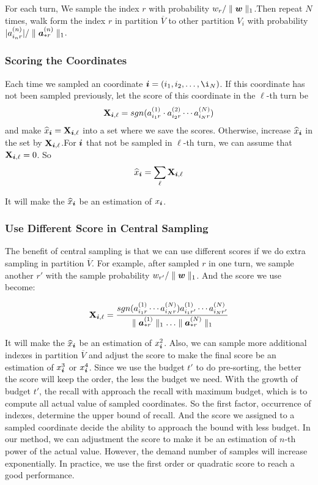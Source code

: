 \documentclass{article}
\newcommand{\Sca}[3]{{#1}^{(#2)}_{i_#2#3}}%
\newcommand{\V}[1]{{\bm{{\MakeLowercase{#1}}}}}
\newcommand{\Vacol}[1]{\V{a}^{(#1)}_{*r}}
\newcommand{\M}[1]{{\bm{\mathbf{\MakeUppercase{#1}}}}}
\newcommand{\norm}[2]{\parallel#1\parallel_{#2}}
\begin{document}
For each turn, We sample the index $r$ with probability $w_r/\norm{\V{w}}{1}$.Then repeat $N$ times, walk form the index $r$ in partition $\overline{V}$ to other partition $V_i$ with probability $|\Sca{a}{n}{r}|/\norm{\Vacol{n}}{1}$.

\subsubsection{Scoring the Coordinates}

Each time we sampled an coordinate $\V{i} = (i_1,i_2,\ldots,\i_N) $. If this coordinate has not been sampled previously, let the score of this coordinate in the $\ell $-th turn be
\[
\M{X}_{\V{i},\ell}  = sgn(\Sca{a}{1}{r}\cdot\Sca{a}{2}{r}\cdots\Sca{a}{N}{r})
\]
and make $\widehat{x}_{\V{i}} = \M{X}_{\V{i},\ell}$ into a set where we save the scores. Otherwise, increase $\widehat{x}_{\V{i}}$ in the set by $\M{X}_{\V{i},\ell}$.For $\V{i}$ that not be sampled in $\ell$-th turn, we can assume that $\M{X}_{\V{i},\ell}=0$. So
\[
\widehat{x}_{\V{i}} = \sum_{\ell} \M{X}_{\V{i},\ell}
\]

It will make the $\widehat{x}_{\V{i}}$ be an estimation of $x_{\V{i}}$.

\subsubsection{Use Different Score in Central Sampling}
The benefit of central sampling is that we can use different scores if we do extra sampling in partition $\overline{V}$. For example, after sampled $r$ in one turn, we sample another $r'$ with the sample probability $w_{r'}/\norm{\V{w}}{1}$. And the score we use become:

\[
\M{X}_{\V{i},\ell}  = \frac{sgn(\Sca{a}{1}{r}\cdots\Sca{a}{N}{r})\Sca{a}{1}{r'}\cdots\Sca{a}{N}{r'}}{\norm{\Vacol{1}}{1}\ldots\norm{\Vacol{N}}{1}}
\]

It will make the $\widehat{x}_{\V{i}}$ be an estimation of $x_{\V{i}}^2$. Also, we can sample more additional indexes in partition $\overline{V}$ and adjust the score to make the final score be an estimation of $x_{\V{i}}^3$ or $x_{\V{i}}^4$. Since we use the budget $t'$ to do pre-sorting, the better the score will keep the order, the less the budget we need. With the growth of budget $t'$, the recall with approach the recall with maximum budget, which is to compute all actual value of sampled coordinates. So the first factor, occurrence of indexes, determine the upper bound of recall. And the score we assigned to a sampled coordinate decide the ability to approach the bound with less budget. In our method, we can adjustment the score to make it be an estimation of $n$-th power of the actual value. However, the demand number of samples will increase exponentially. In practice, we use the first order or quadratic score to reach a good performance.
\end{document}
